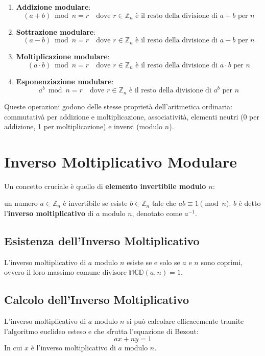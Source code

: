 \documentclass[a4paper,12pt]{report}
\begin{document}
\begin{enumerate}
    \item \textbf{Addizione modulare}:
    $$(a + b) \bmod n = r \quad \text{dove } r \in \mathbb{Z}_n \text{ è il resto della divisione di } a+b \text{ per } n$$
    
    \item \textbf{Sottrazione modulare}:
    $$(a - b) \bmod n = r \quad \text{dove } r \in \mathbb{Z}_n \text{ è il resto della divisione di } a-b \text{ per } n$$
    
    \item \textbf{Moltiplicazione modulare}:
    $$(a \cdot b) \bmod n = r \quad \text{dove } r \in \mathbb{Z}_n \text{ è il resto della divisione di } a \cdot b \text{ per } n$$
    
    \item \textbf{Esponenziazione modulare}:
    $$a^b \bmod n = r \quad \text{dove } r \in \mathbb{Z}_n \text{ è il resto della divisione di } a^b \text{ per } n$$
\end{enumerate}

Queste operazioni godono delle stesse proprietà dell'aritmetica ordinaria: commutativà per addizione e moltiplicazione, associatività, elementi neutri (0 per addizione, 1 per moltiplicazione) e inversi (modulo $n$).

\section{Inverso Moltiplicativo Modulare}

Un concetto cruciale è quello di \textbf{elemento invertibile modulo $n$}: 

un numero $a \in \mathbb{Z}_n$ è invertibile se esiste $b \in \mathbb{Z}_n$ tale che $ab \equiv 1 \pmod{n}$. $b$ è detto l'\textbf{inverso moltiplicativo} di $a$ modulo $n$, denotato come $a^{-1}$.

\subsection*{Esistenza dell'Inverso Moltiplicativo}
L'inverso moltiplicativo di $a$ modulo $n$ esiste se e solo se $a$ e $n$ sono coprimi, ovvero il loro massimo comune divisore $\mathbb{MCD}(a,n) = 1$. 

\subsection*{Calcolo dell'Inverso Moltiplicativo} \label{sec:inverso}
L'inverso moltiplicativo di $a$ modulo $n$ si può calcolare efficacemente tramite l'algoritmo euclideo esteso e che sfrutta l'equazione di Bezout:
\[ ax+ny=1 \]
In cui $x$ è l'inverso moltiplicativo di $a$ modulo $n$.
\end{document}
